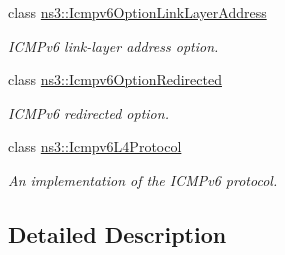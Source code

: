 \begin{DoxyCompactItemize}
class \hyperlink{classns3_1_1Icmpv6OptionLinkLayerAddress}{ns3\+::\+Icmpv6\+Option\+Link\+Layer\+Address}
\begin{DoxyCompactList}\small\item\em I\+C\+M\+Pv6 link-\/layer address option. \end{DoxyCompactList}\item 
class \hyperlink{classns3_1_1Icmpv6OptionRedirected}{ns3\+::\+Icmpv6\+Option\+Redirected}
\begin{DoxyCompactList}\small\item\em I\+C\+M\+Pv6 redirected option. \end{DoxyCompactList}\item 
class \hyperlink{classns3_1_1Icmpv6L4Protocol}{ns3\+::\+Icmpv6\+L4\+Protocol}
\begin{DoxyCompactList}\small\item\em An implementation of the I\+C\+M\+Pv6 protocol. \end{DoxyCompactList}\end{DoxyCompactItemize}


\subsection{Detailed Description}
